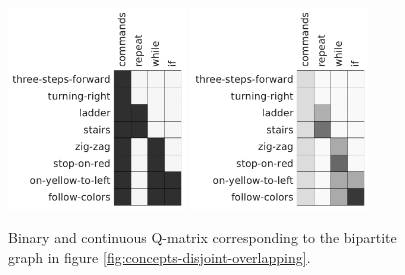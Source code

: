 \begin{figure}[htb]
\begin{center}
  \includegraphics[width=0.42\textwidth]{img/qmatrix-binary}
  \includegraphics[width=0.42\textwidth]{img/qmatrix-continuous}
\end{center}
\caption{%
  Binary and continuous Q-matrix corresponding to the
  bipartite graph in figure \ref{fig:concepts-disjoint-overlapping}.}
\label{fig:qmatrix}
\end{figure}

